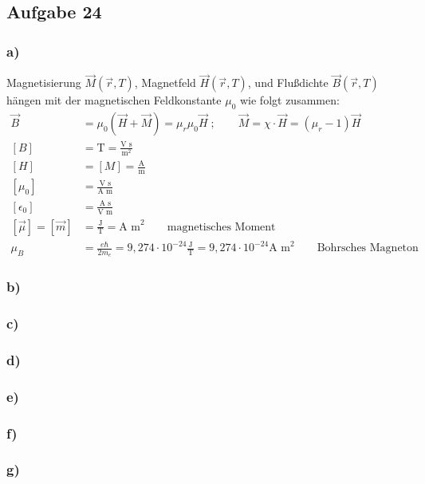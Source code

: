 \subsection*{Aufgabe 24}

\subsubsection*{a)}
Magnetisierung $\vec M(\vec r, T)$, Magnetfeld $\vec H(\vec r, T)$, und Flußdichte
$\vec B(\vec r, T)$ hängen mit der magnetischen Feldkonstante $\mu_0$ wie folgt zusammen:
\begin{align*}
  \vec B &= \mu_0 (\vec H + \vec M) = \mu_r \mu_0 \vec H\; ;\qquad \vec M = \chi \cdot \vec H =  (\mu_r - 1) \vec H\\
  [B] &= \text{T} = \frac{\text{V s}}{\text{m}^2} \\
  [H] &= [M] = \frac{\text{A}}{\text{m}} \\
  [\mu_0] &= \frac{\text{V s}}{\text{A m}} \\
  [\epsilon_0] &= \frac{\text{A s}}{\text{V m}} \\
  [\vec \mu] = [\vec m] &= \frac{\text{J}}{\text{T}} = \text{A m}^2 \qquad \text{magnetisches Moment}\\
  \mu_B &=  \frac{e \hbar}{2 m_e} = 9{,}274 \cdot 10^{-24}\frac{\text{J}}{\text{T}}
    = 9{,}274 \cdot 10^{-24}\text{A m}^2  \qquad \text{Bohrsches Magneton}
\end{align*}

\subsubsection*{b)}

\subsubsection*{c)}

\subsubsection*{d)}

\subsubsection*{e)}

\subsubsection*{f)}

\subsubsection*{g)}
